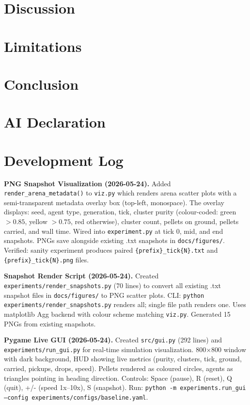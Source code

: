 \documentclass[11pt,a4paper]{article}
\begin{document}
\section{Discussion}
\label{sec:discussion}

\section{Limitations}
\label{sec:limitations}

\section{Conclusion}
\label{sec:conclusion}

\section*{AI Declaration}

\section*{Development Log}
\label{sec:dev-log}
\textbf{PNG Snapshot Visualization (2026-05-24).} Added \texttt{render\_arena\_metadata()} to \texttt{viz.py} which renders arena scatter plots with a semi-transparent metadata overlay box (top-left, monospace). The overlay displays: seed, agent type, generation, tick, cluster purity (colour-coded: green $>0.85$, yellow $>0.75$, red otherwise), cluster count, pellets on ground, pellets carried, and wall time. Wired into \texttt{experiment.py} at tick 0, mid, and end snapshots. PNGs save alongside existing .txt snapshots in \texttt{docs/figures/}. Verified: sanity experiment produces paired \texttt{\{prefix\}\_tick\{N\}.txt} and \texttt{\{prefix\}\_tick\{N\}.png} files.

\textbf{Snapshot Render Script (2026-05-24).} Created \texttt{experiments/render\_snapshots.py} (70 lines) to convert all existing .txt snapshot files in \texttt{docs/figures/} to PNG scatter plots. CLI: \texttt{python experiments/render\_snapshots.py} renders all; single file path renders one. Uses matplotlib Agg backend with colour scheme matching \texttt{viz.py}. Generated 15 PNGs from existing snapshots.

\textbf{Pygame Live GUI (2026-05-24).} Created \texttt{src/gui.py} (292 lines) and \texttt{experiments/run\_gui.py} for real-time simulation visualization. 800$\times$800 window with dark background, HUD showing live metrics (purity, clusters, tick, ground, carried, pickups, drops, speed). Pellets rendered as coloured circles, agents as triangles pointing in heading direction. Controls: Space (pause), R (reset), Q (quit), +/- (speed 1x--10x), S (snapshot). Run: \texttt{python -m experiments.run\_gui --config experiments/configs/baseline.yaml}.
\end{document}
